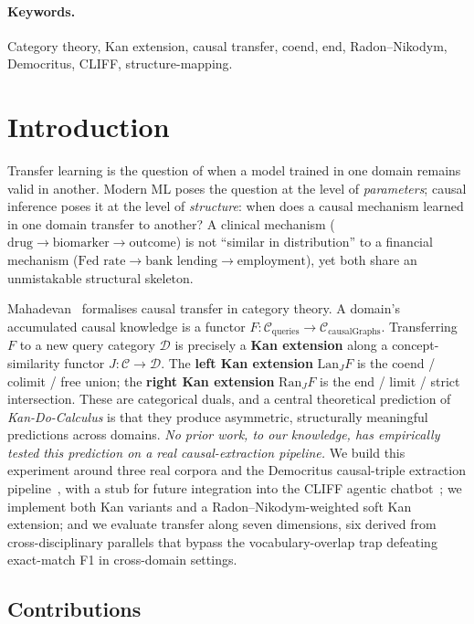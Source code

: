 \documentclass[10pt,letterpaper]{article}
\begin{document}
\paragraph{Keywords.} Category theory, Kan extension, causal transfer, coend, end, Radon--Nikodym, Democritus, CLIFF, structure-mapping.

\section{Introduction}

Transfer learning is the question of when a model trained in one domain remains valid in another. Modern ML poses the question at the level of \emph{parameters}; causal inference poses it at the level of \emph{structure}: when does a causal mechanism learned in one domain transfer to another? A clinical mechanism ($\text{drug}\!\to\!\text{biomarker}\!\to\!\text{outcome}$) is not ``similar in distribution'' to a financial mechanism ($\text{Fed rate}\!\to\!\text{bank lending}\!\to\!\text{employment}$), yet both share an unmistakable structural skeleton.

Mahadevan~\cite{catagi,democritus} formalises causal transfer in category theory. A domain's accumulated causal knowledge is a functor $F : \mathcal{C}_{\text{queries}}\to\mathcal{C}_{\text{causalGraphs}}$. Transferring $F$ to a new query category $\mathcal{D}$ is precisely a \textbf{Kan extension} along a concept-similarity functor $J : \mathcal{C}\to\mathcal{D}$. The \textbf{left Kan extension} $\mathrm{Lan}_J F$ is the coend / colimit / free union; the \textbf{right Kan extension} $\mathrm{Ran}_J F$ is the end / limit / strict intersection. These are categorical duals, and a central theoretical prediction of \emph{Kan-Do-Calculus} is that they produce asymmetric, structurally meaningful predictions across domains. \emph{No prior work, to our knowledge, has empirically tested this prediction on a real causal-extraction pipeline.} We build this experiment around three real corpora and the Democritus causal-triple extraction pipeline~\cite{democritus_repo}, with a stub for future integration into the CLIFF agentic chatbot~\cite{cliff}; we implement both Kan variants and a Radon--Nikodym-weighted soft Kan extension; and we evaluate transfer along seven dimensions, six derived from cross-disciplinary parallels that bypass the vocabulary-overlap trap defeating exact-match F1 in cross-domain settings.

\subsection{Contributions}
\end{document}
